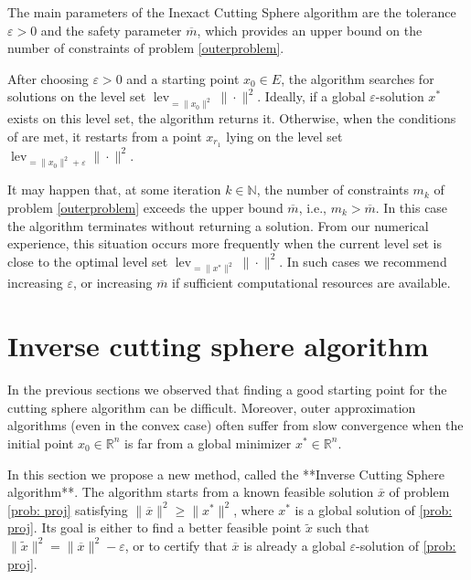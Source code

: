 \documentclass[12pt]{amsart}
\theoremstyle{plain}
\theoremstyle{definition}
\begin{document}
The main parameters of the Inexact Cutting Sphere algorithm \cite[Algorithm 3]{bednarczuk2026outer} are the tolerance \(\varepsilon > 0\) and the safety parameter \(\overline{m}\), which provides an upper bound on the number of constraints of problem \eqref{outerproblem}.

After choosing \(\varepsilon > 0\) and a starting point \(x_0 \in E\), the algorithm searches for solutions on the level set \(\operatorname{lev}_{=\|x_0\|^2} \|\cdot\|^2\). Ideally, if a global \(\varepsilon\)-solution \(x^*\) exists on this level set, the algorithm returns it. Otherwise, when the conditions of \cite[Algorithm 3]{bednarczuk2026outer} are met, it restarts from a point \(x_{r_1}\) lying on the level set \(\operatorname{lev}_{=\|x_0\|^2 + \varepsilon} \|\cdot\|^2\).

It may happen that, at some iteration \(k \in \mathbb{N}\), the number of constraints \(m_k\) of problem \eqref{outerproblem} exceeds the upper bound \(\overline{m}\), i.e., \(m_k > \overline{m}\). In this case the algorithm terminates without returning a solution. From our numerical experience, this situation occurs more frequently when the current level set is close to the optimal level set \(\operatorname{lev}_{=\|x^*\|^2} \|\cdot\|^2\). In such cases we recommend increasing \(\varepsilon\), or increasing \(\overline{m}\) if sufficient computational resources are available.

		
	\section{Inverse cutting sphere algorithm}
\label{sec: inv}

In the previous sections we observed that finding a good starting point for the cutting sphere algorithm can be difficult. Moreover, outer approximation algorithms (even in the convex case) often suffer from slow convergence when the initial point \(x_0 \in \mathbb{R}^n\) is far from a global minimizer \(x^* \in \mathbb{R}^n\).

In this section we propose a new method, called the **Inverse Cutting Sphere algorithm**. The algorithm starts from a known feasible solution \(\overline{x}\) of problem \eqref{prob: proj} satisfying \(\|\overline{x}\|^2 \ge \|x^*\|^2\), where \(x^*\) is a global solution of \eqref{prob: proj}. Its goal is either to find a better feasible point \(\widetilde{x}\) such that \(\|\widetilde{x}\|^2 = \|\overline{x}\|^2 - \varepsilon\), or to certify that \(\overline{x}\) is already a global \(\varepsilon\)-solution of \eqref{prob: proj}.
\end{document}
